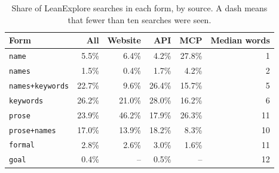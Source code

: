 \documentclass{article}
\newcommand{\thead}[1]{\textbf{#1}}
\newcommand{\rowrule}{\arrayrulecolor{nBorderLight}\specialrule{0.4pt}{3pt}{3pt}\arrayrulecolor{nBorder}}
\newcommand{\code}[1]{\texttt{\small #1}}
\begin{document}
\begin{table}[H]
\centering\small
\caption{Share of LeanExplore searches in each form, by source. A dash means
that fewer than ten searches were seen.}
\label{tab:sources}
\begin{tabular}{@{}lrrrrr@{}}
\toprule
\thead{Form} & \thead{All} & \thead{Website} & \thead{API} & \thead{MCP} & \thead{Median words} \\
\midrule
\code{name} & 5.5\% & 6.4\% & 4.2\% & 27.8\% & 1 \\
\rowrule
\code{names} & 1.5\% & 0.4\% & 1.7\% & 4.2\% & 2 \\
\rowrule
\code{names+keywords} & 22.7\% & 9.6\% & 26.4\% & 15.7\% & 5 \\
\rowrule
\code{keywords} & 26.2\% & 21.0\% & 28.0\% & 16.2\% & 6 \\
\rowrule
\code{prose} & 23.9\% & 46.2\% & 17.9\% & 26.3\% & 11 \\
\rowrule
\code{prose+names} & 17.0\% & 13.9\% & 18.2\% & 8.3\% & 10 \\
\rowrule
\code{formal} & 2.8\% & 2.6\% & 3.0\% & 1.6\% & 11 \\
\rowrule
\code{goal} & 0.4\% & -- & 0.5\% & -- & 12 \\
\bottomrule
\end{tabular}
\end{table}
\end{document}
